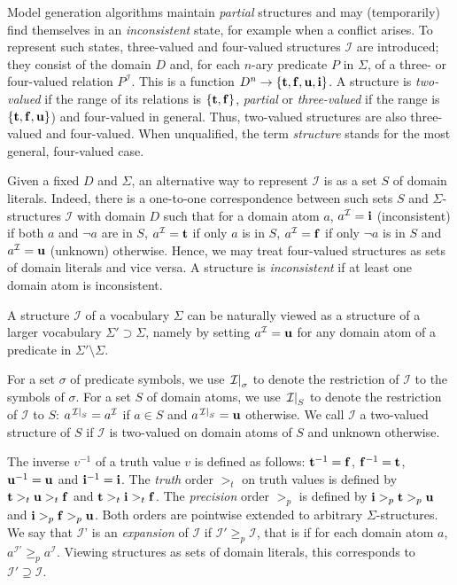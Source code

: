 \documentclass[11pt]{article}
\newcommand{\m}[1]{\ensuremath{#1}\xspace}
\newcommand{\trval}[1]{\m{{\bf #1}}}
\newcommand{\ltrue}{\trval{t}}
\newcommand{\lfalse}{\trval{f}}
\newcommand{\lunkn}{\trval{u}}
\newcommand{\lincon}{\trval{i}}
\newcommand{\voc}{\m{\Sigma}}
\newcommand{\I}{\m{\mathcal{I}}}
\theoremstyle{plain}
\theoremstyle{definition}
\theoremstyle{example_basic}
\theoremstyle{example_contd}
\theoremstyle{plain}
\newcommand{\change}[1]{#1}
\begin{document}
Model generation algorithms maintain {\em partial} structures and may
(temporarily) find themselves in an {\em inconsistent} state, for example when a conflict arises. To represent such states, three-valued and four-valued structures $\I$ are introduced; they consist of the domain $D$ and, for each $n$-ary predicate $P$ in \voc, of a three- or four-valued relation $P^\I$. This is a function $D^n\to\{\ltrue,\lfalse,\lunkn,\lincon\}$. A structure is {\em two-valued} if the range of its relations is $\{\ltrue,\lfalse\}$, {\em partial} or {\em three-valued} if the range is
$\{\ltrue,\lfalse,\lunkn\}$) and four-valued in general. \change{Thus,
two-valued structures are also three-valued and four-valued. When
unqualified, the term {\em structure} stands for the most general, four-valued case.}

\change{Given a fixed $D$ and $\voc$, an alternative way to represent $\I$ is as a set $S$ of domain literals.} Indeed, there is a one-to-one correspondence between such sets $S$ and $\voc$-structures $\I$ with domain $D$ such that for a domain atom $a$, $a^\I=\lincon$ (inconsistent) if both $a$ and $\lnot a$ are in $S$, $a^\I=\ltrue$ if only $a$ is in $S$, $a^\I=\lfalse$ if only $\lnot a$ is in $S$ and $a^\I=\lunkn$ (unknown) otherwise. \change{Hence, we may treat four-valued structures as sets of domain literals and vice versa. A structure is {\em inconsistent} if at least one domain atom is inconsistent.}

\change{A structure $\I$ of a vocabulary $\voc$ can be naturally viewed as a structure of a larger vocabulary $\voc'\supset\voc$, namely by setting $a^\I=\lunkn$ for any domain atom of a predicate in $\voc'\setminus\voc$.}

\change{For a set   $\sigma$ of predicate symbols,  we use $\restr{\I}{\sigma}$ to
denote the restriction of $\I$ to the symbols of $\sigma$.}  For a set $S$ of
domain atoms, we use $\restr{\I}{S}$ to denote the restriction of
$\I$ to $S$: $a^{\restr{\I}{S}}=a^\I$ if $a\in S$ and
$a^{\restr{\I}{S}}=\lunkn$ otherwise.  We call $\I$ a two-valued
structure of $S$ if $\I$ is two-valued on domain atoms of $S$ and
unknown otherwise.

\change{The inverse $v^{-1}$ of a truth value $v$ is defined as follows:
$\ltrue^{-1} = \lfalse$, $\lfalse^{-1} = \ltrue$, $\lunkn^{-1}
=\lunkn$ and $\lincon^{-1} =\lincon$.}  The \emph{truth} order $>_t$ on
truth values is defined by $\ltrue >_t \lunkn >_t \lfalse$ and
$\ltrue>_t \lincon >_t \lfalse$.  The \emph{precision} order $>_p$ is
defined by $\lincon >_p \ltrue >_p \lunkn$ and $\lincon >_p \lfalse
>_p \lunkn$. Both orders are pointwise extended to arbitrary
\voc-structures. We say that \I' is an \emph{expansion} of \I if
$\I'\geq_p \I$, that is if for each domain atom $a$, $a^{\I'} \geq_p
a^\I$.  Viewing structures as sets of domain literals, this
corresponds to $\I' \supseteq \I$.
\end{document}
